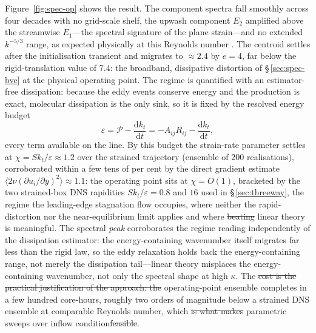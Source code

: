 \documentclass[lineno]{JFM-FLM_Au}
\providecommand{\DIFadd}[1]{{\protect\color{blue}\uwave{#1}}} %
\providecommand{\DIFdel}[1]{{\protect\color{red}\sout{#1}}} %
\providecommand{\DIFaddbegin}{} %
\providecommand{\DIFaddend}{} %
\providecommand{\DIFdelbegin}{} %
\providecommand{\DIFdelend}{} %
\begin{document}
Figure~\ref{fig:spec-op} shows the result. The component spectra fall
smoothly across four decades with no grid-scale shelf, the upwash
component $E_2$ amplified above the streamwise $E_1$---the spectral
signature of the plane strain---and no extended $k^{-5/3}$ range, as
expected physically at this Reynolds number
\citep{Kolmogorov1991,Pope2000}. The centroid settles after the
initialisation transient and migrates to $\approx2.4$ by $e=4$, far
below the rigid-translation value of $7.4$: the broadband, dissipative
distortion of \S\,\ref{sec:spec-bvc} at the physical operating point. The regime is
quantified with an estimator-free dissipation: because the eddy events
conserve energy and the production is exact, molecular dissipation is
the only sink, so it is fixed by the resolved energy budget
\begin{equation}
  \varepsilon = \mathcal{P} - \frac{\mathrm{d}k_t}{\mathrm{d}t}
              = -A_{ij}R_{ij} - \frac{\mathrm{d}k_t}{\mathrm{d}t},
  \label{eq:eps-budget}
\end{equation}
every term available on the line. By this budget the strain-rate
parameter settles at $\chi=Sk_t/\varepsilon\approx1.2$ over the strained
trajectory (ensemble of $200$ realisations), corroborated within a few
tens of per cent by the direct gradient estimate
$\langle2\nu(\partial u_i/\partial y)^2\rangle\approx1.1$: the
operating point sits at $\chi=O(1)$, bracketed by the two strained-box
DNS rapidities $Sk_t/\varepsilon=0.8$ and $16$ used in
\S\,\ref{sec:threeway}, the regime the leading-edge
stagnation flow occupies, where neither the rapid-distortion nor the
near-equilibrium limit applies and where \DIFdelbegin \DIFdel{beating }\DIFdelend \DIFaddbegin \DIFadd{improvement over }\DIFaddend linear theory is meaningful. The spectral \emph{peak} corroborates the regime reading
independently of the dissipation estimator: the energy-containing
wavenumber itself migrates far less than the rigid law, so the eddy
relaxation holds back the energy-containing range, not merely the
dissipation tail---linear theory misplaces the energy-containing
wavenumber, not only the spectral shape at high $\kappa$. The \DIFdelbegin \DIFdel{cost is
the practical justification of the approach: the }\DIFdelend operating-point ensemble completes in a few hundred core-hours, roughly two orders of magnitude below a strained DNS ensemble at comparable Reynolds number, which \DIFdelbegin \DIFdel{is what makes }\DIFdelend \DIFaddbegin \DIFadd{permits }\DIFaddend parametric sweeps over inflow condition\DIFdelbegin \DIFdel{feasible}\DIFdelend .
\end{document}
